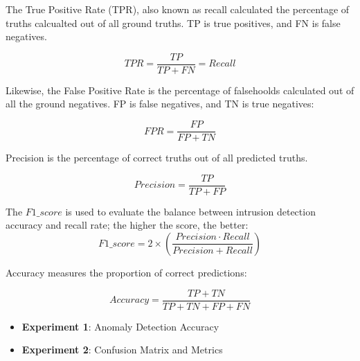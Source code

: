 The True Positive Rate (TPR), also known as recall calculated the percentage of truths calcualted out of all ground truths. TP is true positives, and FN is false negatives. 

\begin{equation}
    TPR = \frac{TP}{TP + FN} = Recall
\end{equation}

Likewise, the False Positive Rate is the percentage of falsehoolds calculated out of all the ground negatives. FP is false negatives, and TN is true negatives:

\begin{equation}
    FPR = \frac{FP}{FP + TN}
\end{equation}

Precision is the percentage of correct truths out of all predicted truths.

\begin{equation}
    Precision = \frac{TP}{TP + FP}
\end{equation}


The $F1\_{score}$ is used to evaluate the balance between intrusion detection accuracy and recall rate; the higher the score, the better:
\begin{equation}
    F1\_{score} = 2 \times (\frac{Precision \cdot Recall}{Precision + Recall})
\end{equation}

Accuracy measures the proportion of correct predictions:

\begin{equation}
    Accuracy = \frac{TP + TN}{TP + TN + FP + FN}
\end{equation}


\begin{itemize}
    \item \textbf{Experiment 1}: Anomaly Detection Accuracy
    \item \textbf{Experiment 2}: Confusion Matrix and Metrics
\end{itemize}

